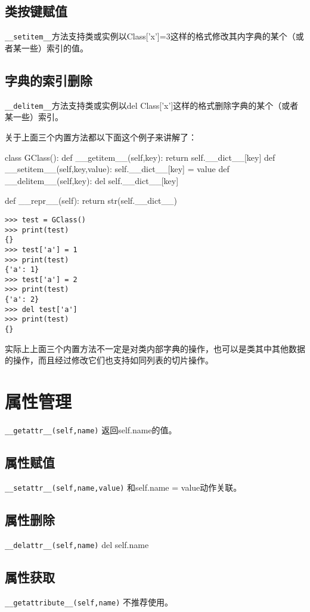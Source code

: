 \documentclass[12pt,oneside]{book}
\begin{document}
\begin{common-format}
\subsection{类按键赋值}
\verb+__setitem__+方法支持类或实例以Class['x']=3这样的格式修改其内字典的某个（或者某一些）索引的值。

\subsection{字典的索引删除}
\verb+__delitem__+方法支持类或实例以del Class['x']这样的格式删除字典的某个（或者某一些）索引。

关于上面三个内置方法都以下面这个例子来讲解了：
\begin{tcbpython}[]
class GClass():
    def __getitem__(self,key):
        return self.__dict__[key]
    def __setitem__(self,key,value):
        self.__dict__[key] = value
    def __delitem__(self,key):
        del self.__dict__[key]

    def __repr__(self):
        return str(self.__dict__)
\end{tcbpython}

\begin{Verbatim}
>>> test = GClass()
>>> print(test)
{}
>>> test['a'] = 1
>>> print(test)
{'a': 1}
>>> test['a'] = 2
>>> print(test)
{'a': 2}
>>> del test['a']
>>> print(test)
{}
\end{Verbatim}

实际上上面三个内置方法不一定是对类内部字典的操作，也可以是类其中其他数据的操作，而且经过修改它们也支持如同列表的切片操作。



\section{属性管理}
\verb+__getattr__(self,name)+  返回self.name的值。 

\subsection{属性赋值}
\verb+__setattr__(self,name,value)+  和self.name = value动作关联。
\subsection{属性删除}
\verb+__delattr__(self,name)+  del self.name


\subsection{属性获取}
\verb+__getattribute__(self,name)+ 不推荐使用。


\end{common-format}
\end{document}
